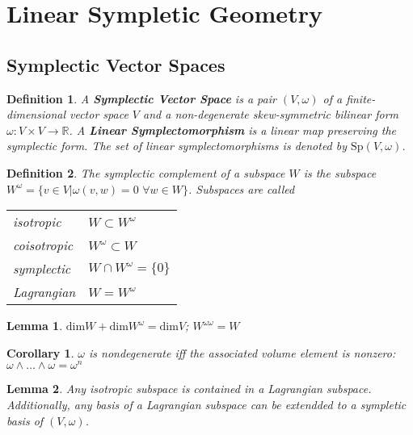 \documentclass{article}
\newtheorem{defn}{Definition}
\newtheorem{cor}{Corollary}
\newtheorem{lem}{Lemma}
\begin{document}
\section{Linear Sympletic Geometry}
\subsection{Symplectic Vector Spaces}
\begin{defn}

A \textbf{Symplectic Vector Space} is a pair $(V,\omega)$ of a finite-dimensional vector space $V$ and a non-degenerate skew-symmetric bilinear form $\omega: V \times V \to \mathbb{R}$. A \textbf{Linear Symplectomorphism} is a linear map preserving the symplectic form. The set of linear symplectomorphisms is denoted by $\mathrm{Sp}(V,\omega)$.

\end{defn}

\begin{defn}

The symplectic complement of a subspace $W$ is the subspace $W^{\omega} = \{v \in V \vert \omega(v,w)=0 \hspace{4pt} \forall w \in W\}$. Subspaces are called \\

\begin{tabular}{l|l}
     isotropic & $W \subset W^{\omega}$ \\
     coisotropic & $W^{\omega} \subset W$ \\
     symplectic & $W \cap W^{\omega} = \{0\}$ \\
     Lagrangian & $W = W^{\omega}$
\end{tabular}

\end{defn}

\begin{lem}

$\mathrm{dim}W + \mathrm{dim}W^{\omega} = \mathrm{dim}V$; $W^{\omega \omega} = W$

\end{lem}

\begin{cor}

$\omega$ is nondegenerate iff the associated volume element is nonzero: $\omega \wedge \ldots \wedge \omega = \omega^n$

\end{cor}

\begin{lem}

Any isotropic subspace is contained in a Lagrangian subspace. Additionally, any basis of a Lagrangian subspace can be extendded to a sympletic basis of $(V,\omega)$.

\end{lem}
\end{document}
